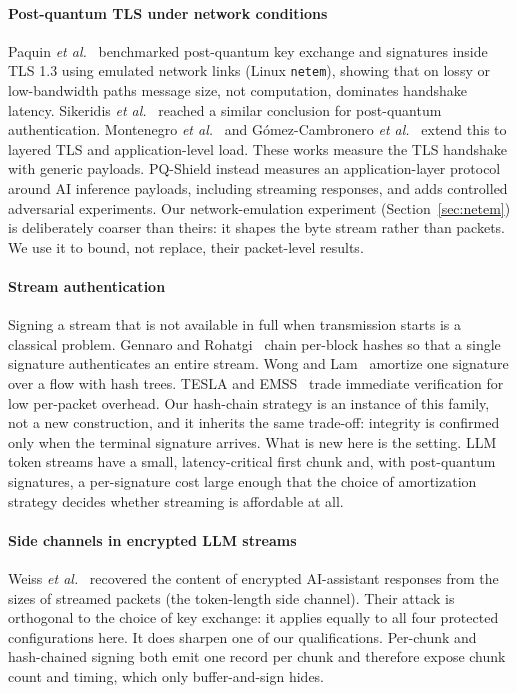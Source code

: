 \paragraph*{Post-quantum TLS under network conditions}
Paquin \emph{et al.}~\cite{paquin2020benchmarking} benchmarked post-quantum key exchange and
signatures inside TLS 1.3 using emulated network links (Linux \texttt{netem}), showing that on
lossy or low-bandwidth paths message size, not computation, dominates handshake latency.
Sikeridis \emph{et al.}~\cite{sikeridis2020authentication} reached a similar conclusion for
post-quantum authentication. Montenegro \emph{et al.}~\cite{montenegro2026framework} and
G\'omez-Cambronero \emph{et al.}~\cite{gomezcambronero2026layered} extend this to layered TLS and
application-level load. These works measure the TLS handshake with generic payloads. PQ-Shield
instead measures an application-layer protocol around AI inference payloads, including streaming
responses, and adds controlled adversarial experiments. Our network-emulation experiment
(Section~\ref{sec:netem}) is deliberately coarser than theirs: it shapes the byte stream rather
than packets. We use it to bound, not replace, their packet-level results.

\paragraph*{Stream authentication}
Signing a stream that is not available in full when transmission starts is a classical problem.
Gennaro and Rohatgi~\cite{gennaro1997streams} chain per-block hashes so that a single signature
authenticates an entire stream. Wong and Lam~\cite{wong1999flows} amortize one signature over a
flow with hash trees. TESLA and EMSS~\cite{perrig2000tesla} trade immediate verification for low
per-packet overhead. Our hash-chain strategy is an instance of this family, not a new construction,
and it inherits the same trade-off: integrity is confirmed only when the terminal signature arrives.
What is new here is the setting. LLM token streams have a small, latency-critical first chunk and,
with post-quantum signatures, a per-signature cost large enough that the choice of amortization
strategy decides whether streaming is affordable at all.

\paragraph*{Side channels in encrypted LLM streams}
Weiss \emph{et al.}~\cite{weiss2024keylogging} recovered the content of encrypted AI-assistant
responses from the sizes of streamed packets (the token-length side channel). Their attack is
orthogonal to the choice of key exchange: it applies equally to all four protected configurations
here. It does sharpen one of our qualifications. Per-chunk and hash-chained signing both emit one
record per chunk and therefore expose chunk count and timing, which only buffer-and-sign hides.

